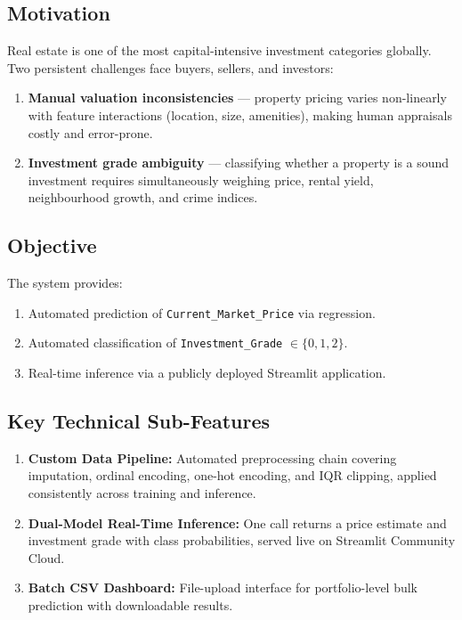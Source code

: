 \documentclass[12pt,a4paper]{article}
\begin{document}
\subsection{Motivation}

Real estate is one of the most capital-intensive investment categories globally.
Two persistent challenges face buyers, sellers, and investors:

\begin{enumerate}
    \item \textbf{Manual valuation inconsistencies} --- property pricing varies
          non-linearly with feature interactions (location, size, amenities),
          making human appraisals costly and error-prone.
    \item \textbf{Investment grade ambiguity} --- classifying whether a property
          is a sound investment requires simultaneously weighing price, rental
          yield, neighbourhood growth, and crime indices.
\end{enumerate}

\subsection{Objective}

The system provides:
\begin{enumerate}
    \item Automated prediction of \texttt{Current\_Market\_Price} via regression.
    \item Automated classification of \texttt{Investment\_Grade} $\in \{0,1,2\}$.
    \item Real-time inference via a publicly deployed Streamlit application.
\end{enumerate}

\subsection{Key Technical Sub-Features}

\begin{enumerate}
    \item \textbf{Custom Data Pipeline:} Automated preprocessing chain covering
          imputation, ordinal encoding, one-hot encoding, and IQR clipping,
          applied consistently across training and inference.
    \item \textbf{Dual-Model Real-Time Inference:} One call returns a price
          estimate and investment grade with class probabilities, served live on
          Streamlit Community Cloud.
    \item \textbf{Batch CSV Dashboard:} File-upload interface for portfolio-level
          bulk prediction with downloadable results.
\end{enumerate}
\end{document}
